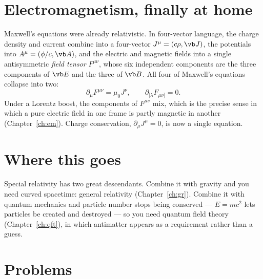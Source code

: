 \section{Electromagnetism, finally at home}

Maxwell's equations were already relativistic. In four-vector language, the charge density and current combine into a four-vector $J^\mu = (c\rho,\vb J)$, the potentials into $A^\mu = (\phi/c,\vb A)$, and the electric and magnetic fields into a single antisymmetric \emph{field tensor} $F^{\mu\nu}$, whose six independent components are the three components of $\vb E$ and the three of $\vb B$. All four of Maxwell's equations collapse into two:
\[
  \partial_\mu F^{\mu\nu} = \mu_0 J^\nu, \qquad \partial_{[\lambda}F_{\mu\nu]} = 0 .
\]
Under a Lorentz boost, the components of $F^{\mu\nu}$ mix, which is the precise sense in which a pure electric field in one frame is partly magnetic in another (Chapter~\ref{ch:em}). Charge conservation, $\partial_\mu J^\mu = 0$, is now a single equation.

\section{Where this goes}

Special relativity has two great descendants. Combine it with gravity and you need curved spacetime: general relativity (Chapter~\ref{ch:gr}). Combine it with quantum mechanics and particle number stops being conserved --- $E=mc^2$ lets particles be created and destroyed --- so you need quantum field theory (Chapter~\ref{ch:qft}), in which antimatter appears as a requirement rather than a guess.

\section{Problems}

